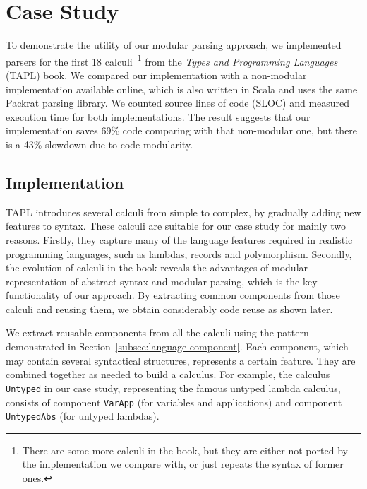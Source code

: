 \section{Case Study}\label{sec:casestudy}

To demonstrate the utility of our modular parsing approach, we
implemented parsers for the first 18 calculi~\footnote{There are some more calculi in the book,
  but they are either not ported by the implementation we compare with, or just repeats the syntax of former ones.}
from the \textit{Types and Programming Languages} (TAPL)
\cite{pierce2002types} book.
We compared our implementation with a non-modular implementation
available online, which is also written in Scala and uses the same Packrat parsing library.
We counted source lines of code (SLOC) and measured execution time for both implementations.
The result suggests that our implementation saves 69\% code comparing
with that non-modular one, but there is a 43\% slowdown due to code modularity.

\subsection{Implementation}\label{subsec:implementation}

TAPL introduces several calculi from simple to complex, by gradually adding new features to syntax.
These calculi are suitable for our case study for mainly two reasons. Firstly, they capture many of the language features
required in realistic programming languages, such as lambdas, records and polymorphism.
Secondly, the evolution of calculi in the book reveals the advantages of modular representation
of abstract syntax and modular parsing, which is the key functionality
of our approach. By extracting common components from those calculi
and reusing them, we obtain considerably code reuse as shown later.

We extract reusable components from all the calculi using the pattern
demonstrated in Section~\ref{subsec:language-component}. Each
component, which may contain several syntactical structures,
represents a certain feature. They are combined together as needed to
build a calculus. For example, the calculus \lstinline{Untyped} in our case study,
representing the famous untyped lambda calculus, consists of component
\lstinline{VarApp} (for variables and applications)
and component \lstinline{UntypedAbs} (for untyped lambdas).

